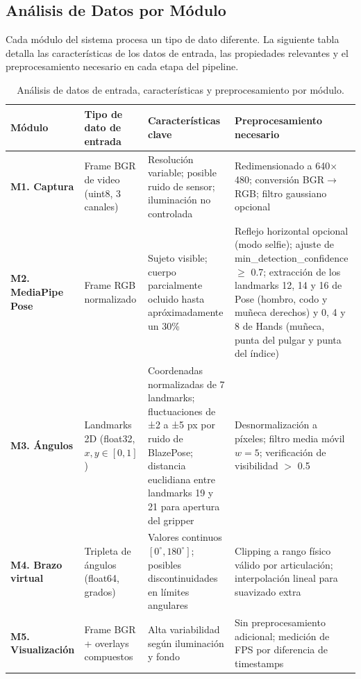 \subsection{Análisis de Datos por Módulo}

Cada módulo del sistema procesa un tipo de dato diferente. La siguiente
tabla detalla las características de los datos de entrada, las propiedades
relevantes y el preprocesamiento necesario en cada etapa del pipeline.

\begin{table}[H]
\centering
\label{tab:datos_modulo}
\renewcommand{\arraystretch}{1.3}
\begin{tabularx}{\textwidth}{
    >{\bfseries}p{2.8cm}
    X
    X
    X
}
\toprule
\textbf{Módulo} &
\textbf{Tipo de dato de entrada} &
\textbf{Características clave} &
\textbf{Preprocesamiento necesario} \\
\midrule
M1. Captura &
  Frame BGR de video (uint8, 3 canales) &
  Resolución variable; posible ruido de sensor; iluminación no controlada &
  Redimensionado a 640$\times$480; conversión BGR$\to$RGB; filtro gaussiano opcional \\
\midrule
M2. MediaPipe Pose &
  Frame RGB normalizado &
  Sujeto visible; cuerpo parcialmente ocluido hasta apróximadamente un 30\% &
  Reflejo horizontal opcional (modo selfie); ajuste de
  min\_detection\_confidence $\geq$ 0.7; extracción de los landmarks 12, 14 y
  16 de Pose (hombro, codo y muñeca derechos) y 0, 4 y 8 de Hands (muñeca,
  punta del pulgar y punta del índice) \\
\midrule
M3. Ángulos &
  Landmarks 2D (float32, $x,y \in [0,1]$) &
  Coordenadas normalizadas de 7 landmarks; fluctuaciones de ±2 a ±5 px por ruido de BlazePose; distancia euclidiana entre landmarks 19 y 21 para apertura del gripper &
  Desnormalización a píxeles; filtro media móvil $w = 5$;
  verificación de visibilidad $>$ 0.5 \\
\midrule
M4. Brazo virtual &
  Tripleta de ángulos (float64, grados) &
  Valores continuos $[0^\circ, 180^\circ]$; posibles discontinuidades en límites angulares &
  Clipping a rango físico válido por articulación;
  interpolación lineal para suavizado extra \\
\midrule
M5. Visualización &
  Frame BGR + overlays compuestos &
  Alta variabilidad según iluminación y fondo &
  Sin preprocesamiento adicional; medición de FPS por diferencia de timestamps \\
\bottomrule
\end{tabularx}
\caption{Análisis de datos de entrada, características y preprocesamiento por módulo.}
\end{table}

